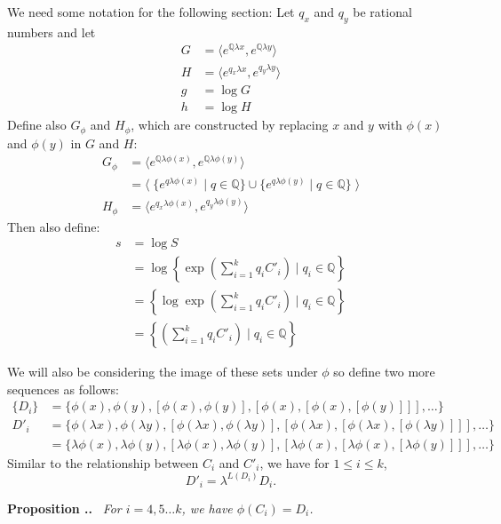 \documentclass[honours]{UNSWthesis}
\newcommand{\Q}{\mathbb{Q}}
\newcommand{\1}{\mathbf{e}_{1}}
\newcommand{\2}{\mathbf{e}_{3}}
\newcommand{\3}{\mathbf{e}_{3}}
\newcounter{Item}[section]
\newenvironment{Proposition}{\medskip
                            \refstepcounter{Item}
                            \noindent
                           {\bf Proposition \thesection.\theItem.}\ %
                            \begingroup \sl}
                           {\endgroup\medskip}
\begin{document}
We need some notation for the following section: \newline
Let $q_{x}$ and $q_{y}$ be rational numbers and let
\begin{align*}
G&= \langle e^{\Q\lambda x},e^{\Q\lambda y} \rangle \\
H&= \langle e^{q_{x}\lambda x},e^{q_{y}\lambda y} \rangle \\
g&= \log G \\
h&= \log H 
\end{align*}
Define also $G_{\phi}$ and $H_{\phi}$, which are constructed by replacing $x$ and $y$ with $\phi(x)$ and $\phi(y)$ in $G$ and $H$:
\begin{align*}
G_{\phi} &= \langle e^{\Q\lambda \phi(x)},e^{\Q\lambda \phi(y)} \rangle \\
&= \langle \; \{ e^{q\lambda \phi(x)} \mid q \in \Q \}\cup \{ e^{q\lambda \phi(y)} \mid q \in \Q \} \; \rangle \\
H_{\phi} &= \langle e^{q_{x}\lambda \phi(x)},e^{q_{y}\lambda \phi(y)} \rangle
\end{align*}
Then also define:
\begin{align*}
s &= \log S \\
&=\log \left\lbrace \exp \left(\sum\limits_{i=1}^{k}q_{i}C'_{i}\right) \mid q_{i} \in \Q \right\rbrace \\
&= \left\lbrace \log \exp \left(\sum\limits_{i=1}^{k}q_{i}C'_{i}\right) \mid q_{i} \in \Q \right\rbrace \\
&=\left\lbrace \left(\sum\limits_{i=1}^{k}q_{i}C'_{i}\right) \mid q_{i} \in \Q \right\rbrace
\end{align*}

We will also be considering the image of these sets under $\phi$ so define two more sequences as follows: 
\begin{align*}
\{ D_{i}\}&= \{\phi(x),\phi(y), [\phi(x),\phi(y)], [\phi(x),[\phi(x),[\phi(y)]]], \ldots  \} \\
D'_{i} &= \{\phi(\lambda x),\phi(\lambda y), [\phi(\lambda x),\phi(\lambda y)], [\phi(\lambda x),[\phi(\lambda x),[\phi(\lambda y)]]], \ldots  \}\\
&=  \{\lambda\phi(x),\lambda\phi(y), [\lambda\phi(x),\lambda\phi(y)], [\lambda\phi(x),[\lambda\phi(x),[\lambda\phi(y)]]], \ldots  \}
\end{align*}
Similar to the relationship between $C_{i}$ and $C'_{i}$, we have for $1 \leq i \leq k$,
\[
D'_{i}= \lambda^{L(D_{i})}D_{i}.
\]

\begin{Proposition}
For $i=4,5\ldots k$, we have $\phi(C_{i})=D_{i}$. 
\end{Proposition}
\end{document}
